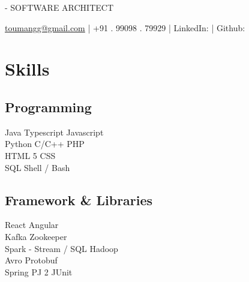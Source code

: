 \documentclass[]{main}
\begin{document}
\lastupdated

 { - SOFTWARE ARCHITECT}
{\href{mailto:toumangg@gmail.com}{toumangg@gmail.com}  |  +91 . 99098 . 79929  | 
LinkedIn: \href{https://www.linkedin.com/in/galaumang}{} | Github: \href{https://github.com/galaumang}{}

}


\begin{minipage}[t]{0.25\textwidth} 



\section{Skills}
\subsection{Programming}\sectionsep
\textbullet{} Java \textbullet{} Typescript \textbullet{} Javascript\\
\textbullet{} Python \textbullet{} C/C++ \textbullet{} PHP\\
\textbullet{} HTML 5 \textbullet{} CSS\\
\textbullet{} SQL \textbullet{} Shell / Bash

\sectionsep
\subsection{Framework \& Libraries}\sectionsep
\textbullet{} React \textbullet{} Angular\\
\textbullet{} Kafka \textbullet{} Zookeeper\\
\textbullet{} Spark - Stream / SQL \textbullet{} Hadoop\\
\textbullet{} Avro \textbullet{} Protobuf\\
\textbullet{} Spring \textbullet{} PJ 2 \textbullet{} JUnit
\sectionsep


\end{minipage}
\end{document}
